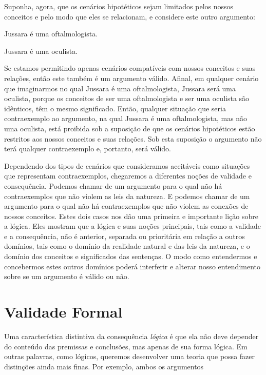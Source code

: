 Suponha, agora, que os cenários hipotéticos sejam limitados pelos nossos conceitos e pelo modo que eles se relacionam, e considere este outro argumento:
	\begin{earg}
		\item[] Jussara é uma oftalmologista.
		\item[\therefore] Jussara é uma oculista.
	\end{earg}
Se estamos permitindo apenas cenários compatíveis com nossos conceitos e suas relações, então este também é um argumento válido.
Afinal, em qualquer cenário que imaginarmos no qual Jussara é uma oftalmologista, Jussara será uma oculista, porque os conceitos de ser uma oftalmologista e ser uma oculista são idênticos, têm o mesmo significado.
Então, qualquer situação que seria contraexemplo ao argumento, na qual Jussara é uma oftalmologista, mas não uma oculista, está proibida sob a suposição de que os cenários hipotéticos estão restritos aos nossos conceitos e suas relações.
Sob esta suposição o argumento não terá qualquer contraexemplo e, portanto, será válido.

Dependendo dos tipos de cenários que consideramos aceitáveis como situações que representam contraexemplos, chegaremos a diferentes noções de validade e consequência.
Podemos chamar de \label{nomoval} um argumento para o qual não há contraexemplos que não violem as leis da natureza.
E podemos chamar de  um argumento para o qual não há contraexemplos que não violem as conexões de nossos conceitos.
Estes dois casos nos dão uma primeira e importante lição sobre a lógica.
Eles mostram que a lógica e suas noções principais, tais como a validade e a consequência, não é anterior, separada ou prioritária em relação a outros domínios, tais como o domínio da realidade natural e das leis da natureza, e o domínio dos conceitos e significados das sentenças.
O modo como entendermos e concebermos estes outros domínios poderá interferir e alterar nosso entendimento sobre se um argumento é válido ou não.

\section{Validade Formal}
\label{ss:ValidadeFormal}

Uma característica distintiva da consequência \emph{lógica} é que ela não deve depender do conteúdo das premissas e conclusões, mas apenas de sua forma lógica.
Em outras palavras, como lógicos, queremos desenvolver uma teoria que possa fazer distinções ainda mais finas. Por exemplo, ambos os argumentos

